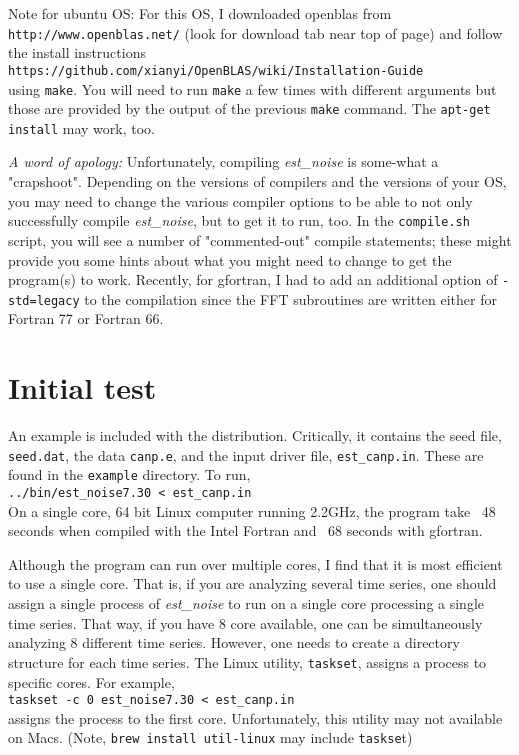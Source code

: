 \documentclass[12pt]{amsart}
\begin{document}
Note for ubuntu OS:  For this OS, I downloaded openblas from 
\\
\texttt{http://www.openblas.net/} (look for download tab near top
of page) and follow the install instructions 
\\
\texttt{https://github.com/xianyi/OpenBLAS/wiki/Installation-Guide}
\\
using \texttt{make}.
You will need to run \texttt{make} a few times with different arguments but those are provided by the output of the previous \texttt{make} command.  The \texttt{apt-get install} may work, too.

\textit{A word of apology:}  Unfortunately, compiling \textit{est\_noise} is some-what a "crapshoot".  Depending on the
versions of compilers and the versions of your OS, you may need to change the various compiler options to be able
to not only successfully compile \textit{est\_noise}, but to get it to run, too. In the \texttt{compile.sh} script, you will
see a number of "commented-out" compile statements; these might provide you some hints about what you might
need to change to get the program(s) to work. Recently, for gfortran, I had to add an additional option of \texttt{-std=legacy}
to the compilation since the FFT subroutines are written either for Fortran 77 or Fortran 66.

\section{Initial test}

An example is included with the distribution. Critically, it contains the seed file, \texttt{seed.dat}, the data \texttt{canp.e}, and the
input driver file, \texttt{est\_canp.in}. These are found in the \texttt{example} directory. To run,
\\
\texttt{../bin/est\_noise7.30 < est\_canp.in} \\
On a single core, 64 bit Linux computer running 2.2GHz, the program take ~48 seconds when compiled with the Intel Fortran and ~68 seconds with gfortran.

Although the program can run over multiple cores, I find that it is most efficient to use a single core.  That is, if you are 
analyzing several time series, one should assign a single process of \textit{est\_noise} to run on a single core processing
a single time series. That way, if you have 8 core available, one can be simultaneously analyzing 8 different time series. However, one needs to
create a directory structure for each time series. The Linux utility, \texttt{taskset}, assigns a process to specific cores. For example,
\\
\texttt{taskset -c 0 est\_noise7.30 < est\_canp.in}\\
assigns the process to the first core.  Unfortunately, this utility may not available on Macs. (Note,  \texttt{brew install util-linux} may
include \texttt{taskse}t)
\end{document}
